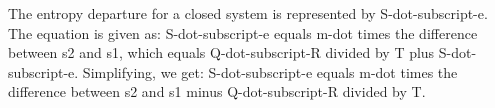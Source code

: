 The entropy departure for a closed system is represented by S-dot-subscript-e. The equation is given as:
S-dot-subscript-e equals m-dot times the difference between s2 and s1, which equals Q-dot-subscript-R divided by T plus S-dot-subscript-e.
Simplifying, we get:
S-dot-subscript-e equals m-dot times the difference between s2 and s1 minus Q-dot-subscript-R divided by T.